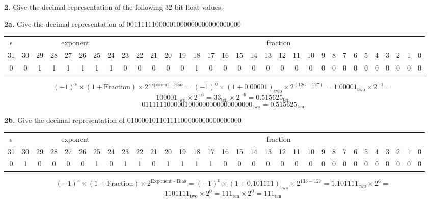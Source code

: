 \documentclass[fleqn]{article}
\begin{document}
\pagebreak

\textbf{2.} Give the decimal representation of the following 32 bit float values.

\vspace{5mm}

\textbf{2a.} Give the decimal representation of 00111111000001000000000000000000
\begin{addmargin}[0.15cm]{0cm}
\begin{table}[H]
    \setlength{\tabcolsep}{4pt}
    \fontsize{7pt}{8pt}\selectfont
    \begin{tabular}{c|cccccccc|ccccccccccccccccccccccc}
        s & \multicolumn{8}{c|}{exponent} & \multicolumn{23}{c}{fraction} \\
        31 & 30 & 29 & 28 & 27 & 26 & 25 & 24 & 23 & 22 & 21 & 20 & 19 & 18 & 17 & 16 & 15 & 14 & 13 & 12 & 11 & 10 & 9 & 8 & 7 & 6 & 5 & 4 & 3 & 2 & 1 & 0 \\
        0 & 0 & 1 & 1 & 1 & 1 & 1 & 1 & 0 & 0 & 0 & 0 & 0 & 1 & 0 & 0 & 0 & 0 & 0 & 0 & 0 & 0 & 0 & 0 & 0 & 0 & 0 & 0 & 0 & 0 & 0 & 0
    \end{tabular}
\end{table}
\vspace{-0.25in}
\[ (-1)^s \times (1 + \text{Fraction}) \times  2^{\text{Exponent - Bias}} = (-1)^0 \times (1 + 0.00001)_{\text{two}} \times 2^{(126 - 127)} = 1.00001_{\text{two}}\times 2^{-1} = \]
\[100001_{\text{two}}\times 2^{-6} = 33_{\text{ten}}\times 2^{-6} = 0.515625_{\text{ten}}\]
\[ \boxed{0111111000001000000000000000000_{\text{two}} = 0.515625_{\text{ten}}} \]

\end{addmargin}
\vspace{0.5in}

\textbf{2b.} Give the decimal representation of 01000010110111100000000000000000
\begin{addmargin}[0.15cm]{0cm}
\begin{table}[H]
    \setlength{\tabcolsep}{4pt}
    \fontsize{7pt}{8pt}\selectfont
    \begin{tabular}{c|cccccccc|ccccccccccccccccccccccc}
        s & \multicolumn{8}{c|}{exponent} & \multicolumn{23}{c}{fraction} \\
        31 & 30 & 29 & 28 & 27 & 26 & 25 & 24 & 23 & 22 & 21 & 20 & 19 & 18 & 17 & 16 & 15 & 14 & 13 & 12 & 11 & 10 & 9 & 8 & 7 & 6 & 5 & 4 & 3 & 2 & 1 & 0 \\
        0 & 1 & 0 & 0 & 0 & 0 & 1 & 0 & 1 & 1 & 0 & 1 & 1 & 1 & 1 & 0 & 0 & 0 & 0 & 0 & 0 & 0 & 0 & 0 & 0 & 0 & 0 & 0 & 0 & 0 & 0 & 0
    \end{tabular}
\end{table}
\vspace{-0.25in}
\[ (-1)^s \times (1 + \text{Fraction}) \times  2^{\text{Exponent - Bias}} = (-1)^0\times(1 + 0.101111)_{\text{two}} \times 2^{133 - 127} = 1.101111_{\text{two}}\times 2^{6} = \]
\[ 1101111_{\text{two}}\times 2^{0} = 111_{\text{ten}}\times 2^{0} = 111_{\text{ten}}\]
\end{addmargin}
\vspace{0.5in}
\end{document}
